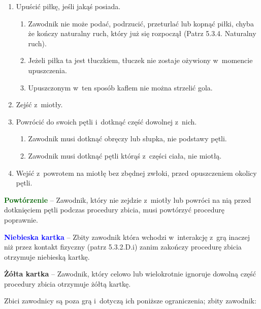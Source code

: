 \documentclass[12pt,a4paper]{article}
\renewcommand{\subsubsection}[1]{
  \oldsubsubsection{#1}%
  \leftskip1.3cm
}
\newcommand\yellowcard[1]{\bgroup\textcolor{darkyellow}{\textbf{#1}}}
\newcommand\bluecard[1]{\bgroup\textcolor{blue}{\textbf{#1}}}
\newcommand\other[1]{\bgroup\textcolor{darkgreen}{\textbf{#1}}}
\begin{document}
\begin{enumerate}
	\item
	      Upuścić piłkę, jeśli jakąś posiada.

	      \begin{enumerate}
		      \item
		            Zawodnik nie może podać, podrzucić, przeturlać lub kopnąć piłki,
		            chyba że kończy naturalny ruch, który już się rozpoczął (Patrz
		            5.3.4. Naturalny ruch).
		      \item
		            Jeżeli piłka ta jest tłuczkiem, tłuczek nie zostaje ożywiony w~momencie upuszczenia.
		      \item
		            Upuszczonym w~ten sposób kaflem nie można strzelić gola.
	      \end{enumerate}
	\item
	      Zejść z~miotły.
	\item
	      Powrócić do swoich pętli i~dotknąć część dowolnej z~nich.

	      \begin{enumerate}
		      \item
		            Zawodnik musi dotknąć obręczy lub słupka, nie podstawy pętli.
		      \item
		            Zawodnik musi dotknąć pętli którąś z~części ciała, nie miotłą.
	      \end{enumerate}
	\item Wejść z~powrotem na miotłę bez zbędnej zwłoki, przed opuszczeniem
	      okolicy pętli.

\end{enumerate}

\other{Powtórzenie} -- Zawodnik, który nie zejdzie z~miotły lub powróci
na nią przed dotknięciem pętli podczas procedury zbicia, musi powtórzyć
procedurę poprawnie.

\bluecard{Niebieska kartka} -- Zbity zawodnik która wchodzi w~interakcję z~grą inaczej
niż przez kontakt fizyczny (patrz 5.3.2.D.i) zanim zakończy procedurę
zbicia otrzymuje niebieską kartkę.

\yellowcard{Żółta kartka} -- Zawodnik, który celowo lub wielokrotnie ignoruje
dowolną część procedury zbicia otrzymuje żółtą kartkę.

\subsubsection{Zbici zawodnicy}

Zbici zawodnicy są poza grą i~dotyczą ich poniższe ograniczenia; zbity
zawodnik:
\end{document}
